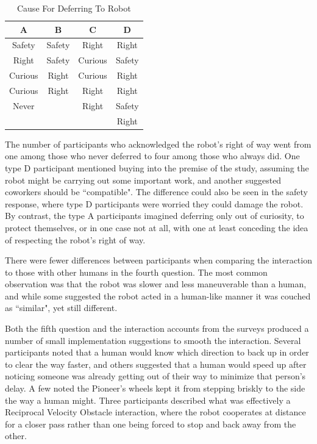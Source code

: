 \documentclass[letterpaper, 10 pt, conference]{ieeeconf}  %
\begin{document}
\begin{table}[h]
\caption{Cause For Deferring To Robot}
\label{Defer}
\begin{center}
\begin{tabular}{|c||c||c||c|}
\hline
\textbf{A} & \textbf{B} & \textbf{C} & \textbf{D}\\
\hline
Safety & Safety & Right & Right\\
\hline
Right & Safety & Curious & Safety\\
\hline
Curious & Right & Curious & Right\\
\hline
Curious & Right & Right & Right\\
\hline
Never & & Right & Safety\\
\hline
 & & & Right\\
\hline
\end{tabular}
\end{center}
\end{table}

The number of participants who acknowledged the robot's right of way went from one among those who never deferred to four among those who always did. One type D participant mentioned buying into the premise of the study, assuming the robot might be carrying out some important work, and another suggested coworkers should be ``compatible". The difference could also be seen in the safety response, where type D participants were worried they could damage the robot. By contrast, the type A participants imagined deferring only out of curiosity, to protect themselves, or in one case not at all, with one at least conceding the idea of respecting the robot's right of way.

There were fewer differences between participants when comparing the interaction to those with other humans in the fourth question. The most common observation was that the robot was slower and less maneuverable than a human, and while some suggested the robot acted in a human-like manner it was couched as ``similar", yet still different.

Both the fifth question and the interaction accounts from the surveys produced a number of small implementation suggestions to smooth the interaction. Several participants noted that a human would know which direction to back up in order to clear the way faster, and others suggested that a human would speed up after noticing someone was already getting out of their way to minimize that person's delay. A few noted the Pioneer's wheels kept it from stepping briskly to the side the way a human might. Three participants described what was effectively a Reciprocal Velocity Obstacle interaction, where the robot cooperates at distance for a closer pass rather than one being forced to stop and back away from the other. 
\end{document}
